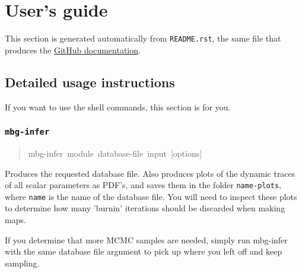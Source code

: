 \chapter{User's guide} 
\label{chap:user} 

This section is generated automatically from \texttt{README.rst}, the same file that produces the \href{github.com/malaria-atlas-project/generic-mbg}{GitHub documentation}. 


\section{Detailed usage instructions%
}

If you want to use the shell commands, this section is for you.




\subsection{\texttt{mbg-infer}%
}
%
\begin{quote}{\ttfamily \raggedright \noindent
mbg-infer~module~database-file~input~{[}options{]}
}
\end{quote}

Produces the requested database file. Also produces plots of the dynamic traces of all
scalar parameters as PDF's, and saves them in the folder \texttt{name-plots}, where \texttt{name}
is the name of the database file. You will need to inspect these plots to determine how
many 'burnin' iterations should be discarded when making maps.

If you determine that more MCMC samples are needed, simply run mbg-infer with the same
database file argument to pick up where you left off and keep sampling.




